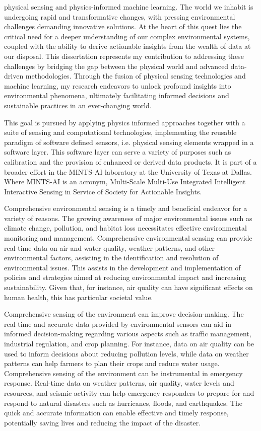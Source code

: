 physical sensing and physics-informed machine learning. The world we inhabit is undergoing rapid and transformative changes, with pressing environmental challenges demanding innovative solutions. At the heart of this quest lies the critical need for a deeper understanding of our complex environmental systems, coupled with the ability to derive actionable insights from the wealth of data at our disposal. This dissertation represents my contribution to addressing these challenges by bridging the gap between the physical world and advanced data-driven methodologies. Through the fusion of physical sensing technologies and machine learning, my research endeavors to unlock profound insights into environmental phenomena, ultimately facilitating informed decisions and sustainable practices in an ever-changing world.



This goal is pursued by applying physics informed approaches together with a suite of sensing and computational technologies, implementing the reusable paradigm of software defined sensors, i.e. physical sensing elements wrapped in a software layer. This software layer can serve a variety of purposes such as calibration and the provision of enhanced or derived data products. It is part of a broader effort in the MINTS-AI laboratory at the University of Texas at Dallas. Where MINTS-AI is an acronym, Multi-Scale Multi-Use Integrated Intelligent Interactive Sensing in Service of Society for Actionable Insights.

Comprehensive environmental sensing is a timely and beneficial endeavor for a variety of reasons. The growing awareness of major environmental issues such as climate change, pollution, and habitat loss necessitates effective environmental monitoring and management. Comprehensive environmental sensing can provide real-time data on air and water quality, weather patterns, and other environmental factors, assisting in the identification and resolution of environmental issues. This assists in the development and implementation of policies and strategies aimed at reducing environmental impact and increasing sustainability. Given that, for instance, air quality can have significant effects on human health, this has particular societal value.

Comprehensive sensing of the environment can improve decision-making. The real-time and accurate data provided by environmental sensors can aid in informed decision-making regarding various aspects such as traffic management, industrial regulation, and crop planning. For instance, data on air quality can be used to inform decisions about reducing pollution levels, while data on weather patterns can help farmers to plan their crops and reduce water usage. Comprehensive sensing of the environment can be instrumental in emergency response. Real-time data on weather patterns, air quality, water levels and resources, and seismic activity can help emergency responders to prepare for and respond to natural disasters such as hurricanes, floods, and earthquakes. The quick and accurate information can enable effective and timely response, potentially saving lives and reducing the impact of the disaster.

